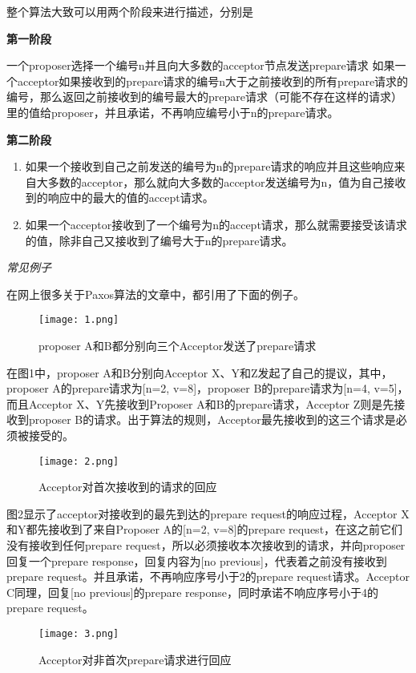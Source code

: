 \documentclass{article}
\begin{document}
整个算法大致可以用两个阶段来进行描述，分别是

	\textbf{第一阶段}

	一个proposer选择一个编号n并且向大多数的acceptor节点发送prepare请求
	如果一个acceptor如果接收到的prepare请求的编号n大于之前接收到的所有prepare请求的编号，那么返回之前接收到的编号最大的prepare请求（可能不存在这样的请求）里的值给proposer，并且承诺，不再响应编号小于n的prepare请求。

	\textbf{第二阶段}
        \begin{enumerate}
	\item 如果一个接收到自己之前发送的编号为n的prepare请求的响应并且这些响应来自大多数的acceptor，那么就向大多数的acceptor发送编号为n，值为自己接收到的响应中的最大的值的accept请求。
        \item 如果一个acceptor接收到了一个编号为n的accept请求，那么就需要接受该请求的值，除非自己又接收到了编号大于n的prepare请求。
        \end{enumerate}


\textit{常见例子}

在网上很多关于Paxos算法的文章中，都引用了下面的例子。

\begin{figure}[hb]
	\centering
	\texttt{[image: 1.png]}
	\caption{proposer A和B都分别向三个Acceptor发送了prepare请求}
	\label{fig:label}
\end{figure}

在图1中，proposer A和B分别向Acceptor X、Y和Z发起了自己的提议，其中，proposer A的prepare请求为[n=2, v=8]，proposer B的prepare请求为[n=4, v=5]，而且Acceptor X、Y先接收到Proposer A和B的prepare请求，Acceptor Z则是先接收到proposer B的请求。出于算法的规则，Acceptor最先接收到的这三个请求是必须被接受的。


\begin{figure}[ht]
	\centering
	\texttt{[image: 2.png]}
	\caption{Acceptor对首次接收到的请求的回应}
	\label{fig:label}
\end{figure}
图2显示了acceptor对接收到的最先到达的prepare request的响应过程，Acceptor X和Y都先接收到了来自Proposer A的[n=2, v=8]的prepare request，在这之前它们没有接收到任何prepare request，所以必须接收本次接收到的请求，并向proposer回复一个prepare response，回复内容为[no previous]，代表着之前没有接收到prepare request。并且承诺，不再响应序号小于2的prepare request请求。Acceptor C同理，回复[no previous]的prepare response，同时承诺不响应序号小于4的prepare request。

\begin{figure}[h]
	\centering
	\texttt{[image: 3.png]}
	\caption{Acceptor对非首次prepare请求进行回应}
	\label{fig:label}
\end{figure}
\end{document}
